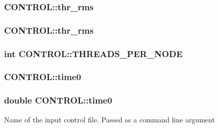 \hypertarget{struct_c_o_n_t_r_o_l_a9f27da44edf8c8ff3c58e0d905165717}{
\subsubsection[{thr\-\_\-rms}]{ C\-O\-N\-T\-R\-O\-L\-::thr\-\_\-rms}}\label{struct_c_o_n_t_r_o_l_a9f27da44edf8c8ff3c58e0d905165717}
\hypertarget{struct_c_o_n_t_r_o_l_a3c3911fd22b4c49cb50795471415c60c}{
\subsubsection[{thr\-\_\-rms}]{ C\-O\-N\-T\-R\-O\-L\-::thr\-\_\-rms}}\label{struct_c_o_n_t_r_o_l_a3c3911fd22b4c49cb50795471415c60c}
\hypertarget{struct_c_o_n_t_r_o_l_ae4d48a7df73459bc0c701c5913d33a6e}{
\subsubsection[{T\-H\-R\-E\-A\-D\-S\-\_\-\-P\-E\-R\-\_\-\-N\-O\-D\-E}]{\setlength{\rightskip}{0pt plus 5cm}int C\-O\-N\-T\-R\-O\-L\-::\-T\-H\-R\-E\-A\-D\-S\-\_\-\-P\-E\-R\-\_\-\-N\-O\-D\-E}}\label{struct_c_o_n_t_r_o_l_ae4d48a7df73459bc0c701c5913d33a6e}
\hypertarget{struct_c_o_n_t_r_o_l_a2fe70e675f28e7a8b9b81cc876835c60}{
\subsubsection[{time0}]{ C\-O\-N\-T\-R\-O\-L\-::time0}}\label{struct_c_o_n_t_r_o_l_a2fe70e675f28e7a8b9b81cc876835c60}
\hypertarget{struct_c_o_n_t_r_o_l_a2a6ddfb272f64ecd13758e08c09173f6}{
\subsubsection[{time0}]{\setlength{\rightskip}{0pt plus 5cm}double C\-O\-N\-T\-R\-O\-L\-::time0}}\label{struct_c_o_n_t_r_o_l_a2a6ddfb272f64ecd13758e08c09173f6}
Name of the input control file. Passed as a command line argument

